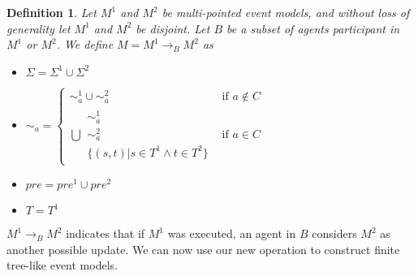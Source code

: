 \documentclass[12pt, a4paper, titlepage]{scrartcl}
\newtheorem{defn}{Definition}
\begin{document}
\begin{defn} \label{possOne}
Let $M^1$ and $M^2$ be multi-pointed event models, and without loss of
generality let $M^1$ and $M^2$ be disjoint.
Let $B$ be a subset of agents participant in $M^1$ or $M^2$.
We define $M = M^1 \to_B M^2$ as 
\begin{itemize}
  \item $\Sigma = \Sigma^1 \cup \Sigma^2$
  \item $\sim_a =
  \begin{cases}
    \sim^1_a \cup \sim^2_a & \text{if } a \notin C \\
    \displaystyle\bigcup \begin{array}{c}
      \sim^1_a \\
      \sim^2_a \\
      \{(s,t) | s \in T^1 \land t \in T^2 \}
    \end{array} & \text{if } a \in C 
  \end{cases}$
  \item $pre = pre^1 \cup pre^2$
  \item $T = T^1$
\end{itemize}
\end{defn}

$M^1 \to_B M^2$ indicates that if $M^1$ was executed, an agent in $B$ considers $M^2$ as another
possible update.
We can now use our new operation to construct finite tree-like event models.

\end{document}
